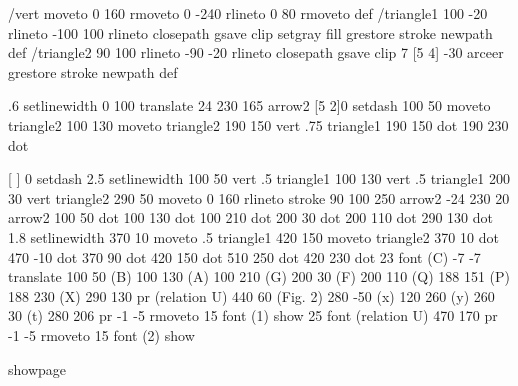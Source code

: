 /vert {moveto 0 160 rmoveto 0 -240 rlineto 0 80 rmoveto} def
/triangle1 {100 -20 rlineto -100 100 rlineto closepath gsave
clip  setgray fill grestore stroke newpath} def
/triangle2 { 90 100 rlineto -90 -20 rlineto closepath gsave
clip 7 [5 4] -30 arceer grestore stroke newpath} def

.6 setlinewidth
0 100 translate
24 230 165 arrow2 [5 2]0 setdash
100 50 moveto triangle2 100 130 moveto triangle2 190 150 vert .75 triangle1
190 150 dot 190 230  dot

[ ] 0 setdash 2.5 setlinewidth
100 50 vert .5 triangle1 100 130 vert .5 triangle1 200 30 vert triangle2
290 50 moveto 0 160 rlineto
stroke
90 100 250 arrow2 -24 230 20 arrow2
100 50 dot 100 130 dot 100 210  dot 200 30 dot 200 110  dot
290 130  dot
1.8 setlinewidth 370 10 moveto .5 triangle1 420 150 moveto triangle2
370 10 dot 470 -10 dot 370 90 dot 420 150 dot 510 250 dot 420 230 dot
23 font (C) -7 -7 translate 100 50 (B) 100 130 (A) 100 210 (G) 200 30 (F)
200 110 (Q) 188 151 (P) 188 230 (X) 290 130 pr (relation U) 440 60
(Fig. 2) 280 -50 (x) 120 260 (y) 260 30 (t) 280 206 pr
-1 -5 rmoveto 15 font (1) show 25 font (relation U) 470 170 pr
-1 -5 rmoveto 15 font (2) show

showpage
